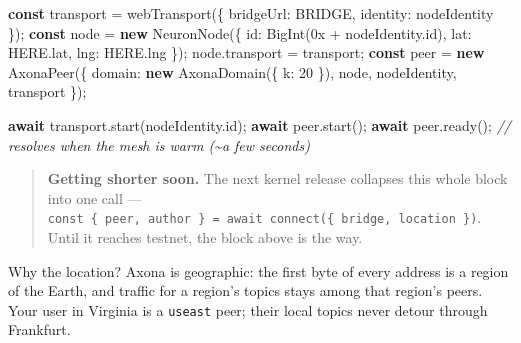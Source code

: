 \documentclass[
  nobib]{tufte-handout}
\newenvironment{Shaded}{}{}
\newcommand{\AttributeTok}[1]{\textcolor[rgb]{0.49,0.56,0.16}{#1}}
\newcommand{\BuiltInTok}[1]{\textcolor[rgb]{0.00,0.50,0.00}{#1}}
\newcommand{\CommentTok}[1]{\textcolor[rgb]{0.38,0.63,0.69}{\textit{#1}}}
\newcommand{\ControlFlowTok}[1]{\textcolor[rgb]{0.00,0.44,0.13}{\textbf{#1}}}
\newcommand{\DataTypeTok}[1]{\textcolor[rgb]{0.56,0.13,0.00}{#1}}
\newcommand{\DecValTok}[1]{\textcolor[rgb]{0.25,0.63,0.44}{#1}}
\newcommand{\FunctionTok}[1]{\textcolor[rgb]{0.02,0.16,0.49}{#1}}
\newcommand{\KeywordTok}[1]{\textcolor[rgb]{0.00,0.44,0.13}{\textbf{#1}}}
\newcommand{\NormalTok}[1]{#1}
\newcommand{\OperatorTok}[1]{\textcolor[rgb]{0.40,0.40,0.40}{#1}}
\newcommand{\StringTok}[1]{\textcolor[rgb]{0.25,0.44,0.63}{#1}}
\begin{document}
\begin{Shaded}
\begin{Highlighting}[]
\KeywordTok{const}\NormalTok{ transport }\OperatorTok{=} \FunctionTok{webTransport}\NormalTok{(\{ }\DataTypeTok{bridgeUrl}\OperatorTok{:}\NormalTok{ BRIDGE}\OperatorTok{,} \DataTypeTok{identity}\OperatorTok{:}\NormalTok{ nodeIdentity \})}\OperatorTok{;}
\KeywordTok{const}\NormalTok{ node      }\OperatorTok{=} \KeywordTok{new} \FunctionTok{NeuronNode}\NormalTok{(\{ }\DataTypeTok{id}\OperatorTok{:} \BuiltInTok{BigInt}\NormalTok{(}\StringTok{\textquotesingle{}0x\textquotesingle{}} \OperatorTok{+}\NormalTok{ nodeIdentity}\OperatorTok{.}\AttributeTok{id}\NormalTok{)}\OperatorTok{,}
                                   \DataTypeTok{lat}\OperatorTok{:}\NormalTok{ HERE}\OperatorTok{.}\AttributeTok{lat}\OperatorTok{,} \DataTypeTok{lng}\OperatorTok{:}\NormalTok{ HERE}\OperatorTok{.}\AttributeTok{lng}\NormalTok{ \})}\OperatorTok{;}
\NormalTok{node}\OperatorTok{.}\AttributeTok{transport}  \OperatorTok{=}\NormalTok{ transport}\OperatorTok{;}
\KeywordTok{const}\NormalTok{ peer }\OperatorTok{=} \KeywordTok{new} \FunctionTok{AxonaPeer}\NormalTok{(\{ }\DataTypeTok{domain}\OperatorTok{:} \KeywordTok{new} \FunctionTok{AxonaDomain}\NormalTok{(\{ }\DataTypeTok{k}\OperatorTok{:} \DecValTok{20}\NormalTok{ \})}\OperatorTok{,}
\NormalTok{                             node}\OperatorTok{,}\NormalTok{ nodeIdentity}\OperatorTok{,}\NormalTok{ transport \})}\OperatorTok{;}

\ControlFlowTok{await}\NormalTok{ transport}\OperatorTok{.}\FunctionTok{start}\NormalTok{(nodeIdentity}\OperatorTok{.}\AttributeTok{id}\NormalTok{)}\OperatorTok{;}
\ControlFlowTok{await}\NormalTok{ peer}\OperatorTok{.}\FunctionTok{start}\NormalTok{()}\OperatorTok{;}
\ControlFlowTok{await}\NormalTok{ peer}\OperatorTok{.}\FunctionTok{ready}\NormalTok{()}\OperatorTok{;}          \CommentTok{// resolves when the mesh is warm (\textasciitilde{}a few seconds)}
\end{Highlighting}
\end{Shaded}

\begin{quote}
\textbf{Getting shorter soon.} The next kernel release collapses this
whole block into one call ---
\texttt{const\ \{\ peer,\ author\ \}\ =\ await\ connect(\{\ bridge,\ location\ \})}.
Until it reaches testnet, the block above is the way.
\end{quote}

Why the location? Axona is geographic: the first byte of every address
is a region of the Earth, and traffic for a region's topics stays among
that region's peers. Your user in Virginia is a \texttt{useast} peer;
their local topics never detour through Frankfurt.
\end{document}
